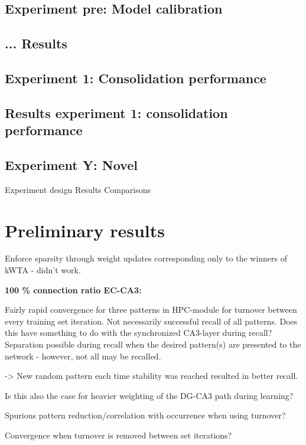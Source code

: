 \subsection{Experiment pre: Model calibration}
\subsection{... Results}

\subsection{Experiment 1: Consolidation performance}
\subsection{Results experiment 1: consolidation performance}

\subsection{Experiment Y: Novel}



Experiment design
Results
Comparisons

\section{Preliminary results}

Enforce sparsity through weight updates corresponding only to the winners of kWTA - didn't work.

\textbf{100 \% connection ratio EC-CA3:}

Fairly rapid convergence for three patterns in HPC-module for turnover between every training set iteration. 
Not necessarily successful recall of all patterns. Does this have something to do with the synchronized CA3-layer during recall? Separation possible during recall when the desired pattern(s) are presented to the network - however, not all may be recalled.

-> New random pattern each time stability was reached resulted in better recall.

Is this also the case for heavier weighting of the DG-CA3 path during learning?

Spurious pattern reduction/correlation with occurrence when using turnover?

Convergence when turnover is removed between set iterations?

